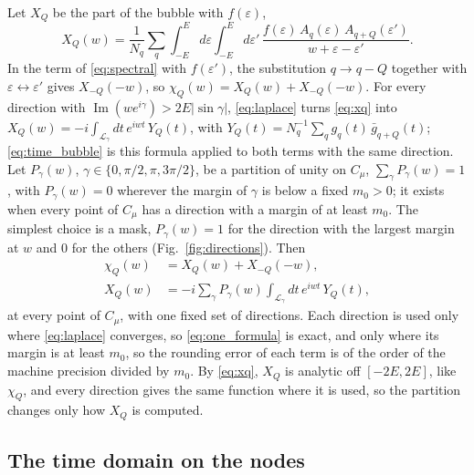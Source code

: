 \documentclass[aps,prb,reprint,a4paper]{revtex4-2}
\DeclareMathOperator{\Imag}{Im}
\begin{document}
Let $X_Q$ be the part of the bubble with $f(\varepsilon)$,
\begin{equation}
  X_Q(w)=\frac1{N_q}\sum_q\int_{-E}^{E}d\varepsilon\int_{-E}^{E}d\varepsilon'\,\frac{f(\varepsilon)\,A_q(\varepsilon)\,A_{q+Q}(\varepsilon')}{w+\varepsilon-\varepsilon'}.
  \label{eq:xq}
\end{equation}
In the term of \eqref{eq:spectral} with $f(\varepsilon')$, the substitution $q\to q-Q$ together with $\varepsilon\leftrightarrow\varepsilon'$ gives $X_{-Q}(-w)$, so $\chi_Q(w)=X_Q(w)+X_{-Q}(-w)$. For every direction with $\Imag(we^{i\gamma})>2E\lvert\sin\gamma\rvert$, \eqref{eq:laplace} turns \eqref{eq:xq} into $X_Q(w)=-i\int_{\mathcal L_\gamma}dt\,e^{iwt}\,Y_Q(t)$, with $Y_Q(t)=N_q^{-1}\sum_qg_q(t)\,\bar g_{q+Q}(t)$; \eqref{eq:time_bubble} is this formula applied to both terms with the same direction. Let $P_\gamma(w)$, $\gamma\in\{0,\pi/2,\pi,3\pi/2\}$, be a partition of unity on $C_\mu$, $\sum_\gamma P_\gamma(w)=1$, with $P_\gamma(w)=0$ wherever the margin of $\gamma$ is below a fixed $m_0>0$; it exists when every point of $C_\mu$ has a direction with a margin of at least $m_0$. The simplest choice is a mask, $P_\gamma(w)=1$ for the direction with the largest margin at $w$ and $0$ for the others (Fig.~\ref{fig:directions}). Then
\begin{equation}
  \begin{aligned}
  \chi_Q(w)&=X_Q(w)+X_{-Q}(-w),\\
  X_Q(w)&=-i\sum_\gamma P_\gamma(w)\int_{\mathcal L_\gamma}dt\,e^{iwt}\,Y_Q(t),
  \end{aligned}
  \label{eq:one_formula}
\end{equation}
at every point of $C_\mu$, with one fixed set of directions. Each direction is used only where \eqref{eq:laplace} converges, so \eqref{eq:one_formula} is exact, and only where its margin is at least $m_0$, so the rounding error of each term is of the order of the machine precision divided by $m_0$. By \eqref{eq:xq}, $X_Q$ is analytic off $[-2E,2E]$, like $\chi_Q$, and every direction gives the same function where it is used, so the partition changes only how $X_Q$ is computed.

\subsection{The time domain on the nodes}
\label{sec:quadrature}
\end{document}
